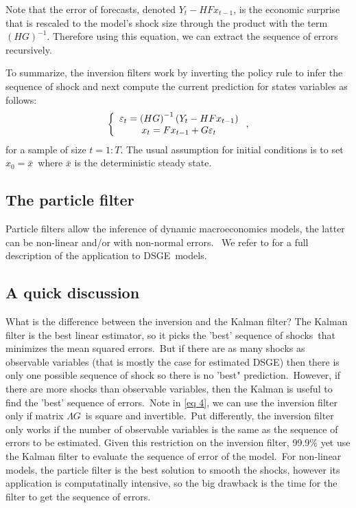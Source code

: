 \documentclass[a4paper,12pt]{article}%
\begin{document}
Note that the error of forecasts, denoted $Y_{t}-HFx_{t-1}$, is the economic
surprise that is rescaled to the model's shock size through the product with
the term $\left(  HG\right)  ^{-1}$. Therefore using this equation, we can
extract the sequence of errors recursively.

To summarize, the inversion filters work by inverting the policy rule to infer
the sequence of shock and next compute the current prediction for states
variables as follows:%
\[
\left\{
\begin{array}
[c]{c}%
\varepsilon_{t}=\left(  HG\right)  ^{-1}\left(  Y_{t}-HFx_{t-1}\right) \\
x_{t}=Fx_{t-1}+G\varepsilon_{t}%
\end{array}
\right.  ,
\]
for a sample of size $t=1:T$. The usual assumption for initial conditions is
to set $x_{0}=\bar{x}$\ where $\bar{x}$ is the deterministic steady state.

\subsection{The particle filter}

Particle filters allow the inference of dynamic macroeconomics models, the
latter can be non-linear and/or with non-normal errors. \ We refer to
\cite{fernandez2007estimating} for a full description of the application to DSGE\ models.

\subsection{A quick discussion}

What is the difference between the inversion and the Kalman filter? The Kalman
filter is the best linear estimator, so it picks the 'best' sequence of
shocks\ that minimizes the mean squared errors.\ But if there are as many
shocks as observable variables (that is mostly the case for estimated DSGE)
then there is only one possible sequence of shock so there is no 'best"
prediction.\ However, if there are more shocks than observable variables, then
the Kalman is useful to find the 'best' sequence of errors.\ Note in
\autoref{eq 4}, we can use the inversion filter only if matrix $\Lambda G$\ is
square and invertible.\ Put differently, the inversion filter only works if
the number of observable variables is the same as the sequence of errors to be
estimated. Given this restriction on the inversion filter, 99.9\% yet use the
Kalman filter to evaluate the sequence of error of the model.\ For non-linear
models, the particle filter is the best solution to smooth the shocks, however
its application is computatinally intensive, so the big drawback is the time
for the filter to get the sequence of errors.
\end{document}
